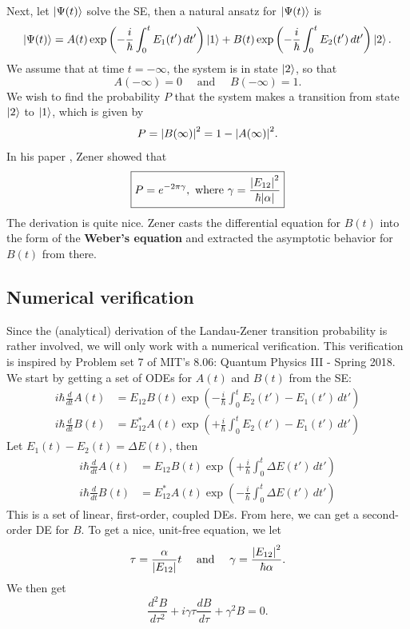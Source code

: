 \documentclass{article}
\theoremstyle{definition}
\newcommand{\al}{\alpha}
\newcommand{\f}[2]{\frac{#1}{#2}}
\newcommand{\lp}{\left(}
\newcommand{\rp}{\right)}
\begin{document}
Next, let $\ket{\Psi(t)}$ solve the SE, then a natural ansatz for $\ket{\Psi(t)}$ is 
\begin{equation*}
\ket{\Psi(t)} = A(t) \exp \lp -\f{i}{\hbar}\int_0^{t} E_1(t')\,dt' \rp \ket{1} + B(t) \exp \lp -\f{i}{\hbar}\int_0^{t} E_2(t')\,dt' \rp \ket{2}.
\end{equation*}
We assume that at time $t=-\infty$, the system is in state $\ket{2}$, so that
\begin{equation*}
A(-\infty) = 0 \quad \text{ and } \quad B(-\infty) = 1.
\end{equation*}
We wish to find the probability $P$ that the system makes a transition from state $\ket{2}$ to $\ket{1}$, which is given by 
\begin{equation*}
P = \abs{B(\infty)}^2 = 1- \abs{A(\infty)}^2.
\end{equation*}
In his paper \cite{zener1932non}, Zener showed that 
\begin{equation*}
\boxed{P = e^{-2\pi \gamma}, \text{ where } \gamma = \f{\abs{E_{12}}^2}{\hbar \abs{\al}}} 
\end{equation*}
The derivation is quite nice. Zener casts the differential equation for $B(t)$ into the form of the \textbf{Weber's equation} and extracted the asymptotic behavior for $B(t)$ from there. 


\subsection{Numerical verification}



Since the (analytical) derivation of the Landau-Zener transition probability is rather involved, we will only work with a numerical verification. This verification is inspired by Problem set 7 of MIT's 8.06: Quantum Physics III - Spring 2018. \\


We start by getting a set of ODEs for $A(t)$ and $B(t)$ from the SE:
\begin{align*}
i\hbar  \f{d}{dt}A(t) &= E_{12} B(t)  \exp\lp -\f{i}{\hbar} \int_0^t E_2(t') - E_1(t') \,dt'\rp\\
i\hbar  \f{d}{dt}B(t) &= E_{12}^* A(t)  \exp\lp +\f{i}{\hbar} \int_0^t E_2(t') - E_1(t') \,dt'\rp
\end{align*}
Let $E_1(t) - E_2(t) = \Delta E(t)$, then 
\begin{align*}
i\hbar  \f{d}{dt}A(t) &= E_{12} B(t)  \exp\lp +\f{i}{\hbar} \int_0^t \Delta E(t') \,dt'\rp\\
i\hbar  \f{d}{dt}B(t) &= E_{12}^* A(t)  \exp\lp -\f{i}{\hbar} \int_0^t \Delta E(t') \,dt'\rp
\end{align*}
This is a set of linear, first-order, coupled DEs. From here, we can get a second-order DE for $B$. To get a nice, unit-free equation, we let
\begin{equation*}
\tau = \f{\al}{\abs{E_{12}}} t \quad \text{ and } \quad \gamma = \f{\abs{E_{12}}^2}{\hbar \al}.
\end{equation*}
We then get
\begin{equation*}
\f{d^2 B}{d\tau^2} + i\gamma \tau \f{dB}{d\tau} + \gamma^2 B = 0.
\end{equation*}
\end{document}
